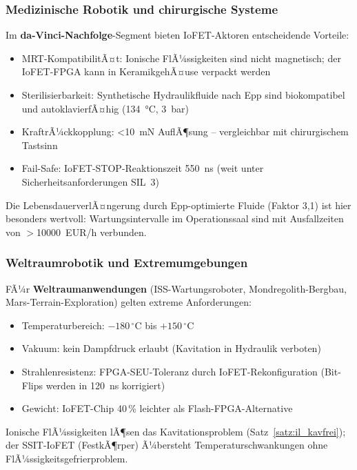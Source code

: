 ﻿\documentclass[a4paper,12pt]{scrreprt}
\theoremstyle{definition}
\begin{document}
\subsubsection{Medizinische Robotik und chirurgische Systeme}

Im \textbf{da-Vinci-Nachfolge}-Segment bieten IoFET-Aktoren entscheidende
Vorteile:
\begin{itemize}
  \item MRT-KompatibilitÃ¤t: Ionische FlÃ¼ssigkeiten sind nicht magnetisch;
        der IoFET-FPGA kann in KeramikgehÃ¤use verpackt werden
  \item Sterilisierbarkeit: Synthetische Hydraulikfluide nach Epp sind
        biokompatibel und autoklavierfÃ¤hig (\SI{134}{\celsius}, \SI{3}{\bar})
  \item KraftrÃ¼ckkopplung: \SI{<10}{\milli\newton} AuflÃ¶sung --
        vergleichbar mit chirurgischem Tastsinn
  \item Fail-Safe: IoFET-STOP-Reaktionszeit \SI{550}{\nano\second}
        (weit unter Sicherheitsanforderungen SIL~3)
\end{itemize}
Die LebensdauerverlÃ¤ngerung durch Epp-optimierte Fluide (Faktor 3,1)
ist hier besonders wertvoll: Wartungsintervalle im Operationssaal
sind mit Ausfallzeiten von $>$\num{10000}~EUR/h verbunden.

\subsubsection{Weltraumrobotik und Extremumgebungen}

FÃ¼r \textbf{Weltraumanwendungen} (ISS-Wartungsroboter, Mondregolith-Bergbau,
Mars-Terrain-Exploration) gelten extreme Anforderungen:
\begin{itemize}
  \item Temperaturbereich: $-180\,{}^{\circ}\text{C}$ bis $+150\,{}^{\circ}\text{C}$
  \item Vakuum: kein Dampfdruck erlaubt (Kavitation in Hydraulik verboten)
  \item Strahlenresistenz: FPGA-SEU-Toleranz durch IoFET-Rekonfiguration
        (Bit-Flips werden in \SI{120}{\nano\second} korrigiert)
  \item Gewicht: IoFET-Chip 40\,\% leichter als Flash-FPGA-Alternative
\end{itemize}
Ionische FlÃ¼ssigkeiten lÃ¶sen das Kavitationsproblem (Satz~\ref{satz:il_kavfrei});
der SSIT-IoFET (FestkÃ¶rper) Ã¼bersteht Temperaturschwankungen ohne
FlÃ¼ssigkeitsgefrierproblem.
\end{document}
